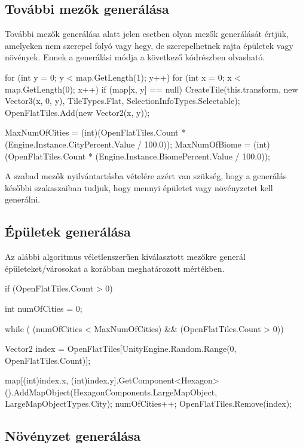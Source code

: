 \subsection{További mezők generálása}

További mezők generálása alatt jelen esetben olyan mezők generálását értjük, amelyeken nem szerepel folyó vagy hegy, de szerepelhetnek rajta épületek vagy növények. Ennek a generálási módja a következő kódrészben olvasható.
\begin{cpp}
for (int y = 0; y < map.GetLength(1); y++)
{
   for (int x = 0; x < map.GetLength(0); x++)
   {
      if (map[x, y] == null)
      {
         CreateTile(this.transform, new Vector3(x, 0, y),
         TileTypes.Flat, SelectionInfoTypes.Selectable);
         OpenFlatTiles.Add(new Vector2(x, y));
      }
   }
}

MaxNumOfCities = (int)(OpenFlatTiles.Count * 
(Engine.Instance.CityPercent.Value / 100.0));
MaxNumOfBiome = (int)(OpenFlatTiles.Count * 
(Engine.Instance.BiomePercent.Value / 100.0));
\end{cpp}

A szabad mezők nyilvántartásba vételére azért van szükség, hogy a generálás későbbi szakaszaiban tudjuk, hogy mennyi épületet vagy növényzetet kell generálni.

\subsection{Épületek generálása}

Az alábbi algoritmus véletlenszerűen kiválasztott mezőkre generál épületeket/városokat a korábban meghatározott mértékben.
\begin{cpp}
if (OpenFlatTiles.Count > 0)
{
   int numOfCities = 0;
    
   while ( (numOfCities < MaxNumOfCities) && (OpenFlatTiles.Count > 0))
   {
      Vector2 index = OpenFlatTiles[UnityEngine.Random.Range(0, 
      OpenFlatTiles.Count)];

      map[(int)index.x, (int)index.y].GetComponent<Hexagon>
      ().AddMapObject(HexagonComponents.LargeMapObject, 
      LargeMapObjectTypes.City);
      numOfCities++;
      OpenFlatTiles.Remove(index);
   }
}
\end{cpp}

\subsection{Növényzet generálása}

